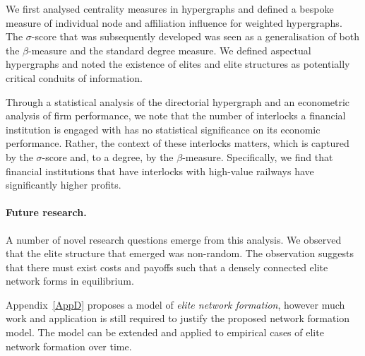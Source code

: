 We first analysed centrality measures in hypergraphs and defined a bespoke measure of individual node and affiliation influence for weighted hypergraphs. The $\sigma$-score that was subsequently developed was seen as a generalisation of both the $\beta$-measure and the standard degree measure. We defined aspectual hypergraphs and noted the existence of elites and elite structures as potentially critical conduits of information.

Through a statistical analysis of the directorial hypergraph and an econometric analysis of firm performance, we note that the number of interlocks a financial institution is engaged with has no statistical significance on its economic performance. Rather, the context of these interlocks matters, which is captured by the $\sigma$-score and, to a degree, by the $\beta$-measure. Specifically, we find that financial institutions that have interlocks with high-value railways have significantly higher profits.

\paragraph{Future research.}

A number of novel research questions emerge from this analysis. We observed that the elite structure that emerged was non-random. The observation suggests that there must exist costs and payoffs such that a densely connected elite network forms in equilibrium. 

Appendix~\ref{AppD} proposes a model of \emph{elite network formation}, however much work and application is still required to justify the proposed network formation model. The model can be extended and applied to empirical cases of elite network formation over time.

